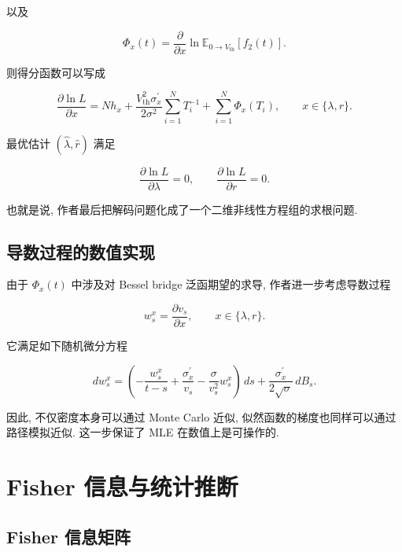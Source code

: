 \documentclass[oneside]{ctexart}
\begin{document}
以及

\begin{equation}
    \Phi_x(t)
    =
    \dfrac{\partial}{\partial x}
    \ln
    \mathbb{E}_{0\to V_{\mathrm{th}}}[f_2(t)].
\end{equation}

则得分函数可以写成

\begin{equation}
    \dfrac{\partial \ln L}{\partial x}
    =
    N h_x
    +
    \dfrac{V_{\mathrm{th}}^2\sigma_x^{'}}{2\sigma^2}
    \sum\limits_{i=1}^{N}T_i^{-1}
    +
    \sum\limits_{i=1}^{N}\Phi_x(T_i), \qquad x\in\{\lambda,r\}.
\end{equation}

最优估计 $(\hat{\lambda},\hat{r})$ 满足

\begin{equation}
    \dfrac{\partial \ln L}{\partial \lambda}=0, \qquad
    \dfrac{\partial \ln L}{\partial r}=0.
\end{equation}

也就是说, 作者最后把解码问题化成了一个二维非线性方程组的求根问题.

\subsection{导数过程的数值实现}

由于 $\Phi_x(t)$ 中涉及对 Bessel bridge 泛函期望的求导, 作者进一步考虑导数过程

\begin{equation}
    w_s^x=\dfrac{\partial v_s}{\partial x}, \qquad x\in\{\lambda,r\}.
\end{equation}

它满足如下随机微分方程

\begin{equation}
    dw_s^x
    =
    \left(
    -\dfrac{w_s^x}{t-s}
    +
    \dfrac{\sigma_x^{'}}{v_s}
    -
    \dfrac{\sigma}{v_s^2}w_s^x
    \right)\,ds
    +
    \dfrac{\sigma_x^{'}}{2\sqrt{\sigma}}\,dB_s.
\end{equation}

因此, 不仅密度本身可以通过 Monte Carlo 近似, 似然函数的梯度也同样可以通过路径模拟近似. 这一步保证了 MLE 在数值上是可操作的.

\section{Fisher 信息与统计推断}

\subsection{Fisher 信息矩阵}
\end{document}
